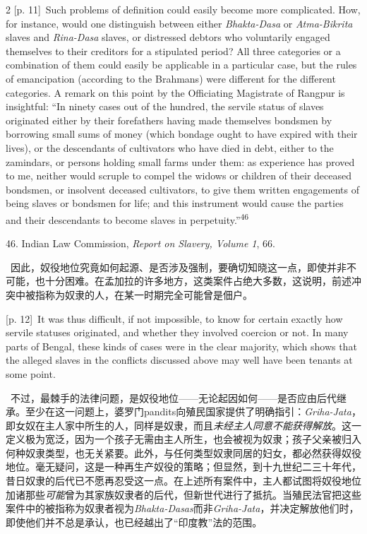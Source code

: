 \documentclass[10pt,a4paper]{article}
\begin{document}
\begin{paracol}{2}
\switchcolumn
{\scriptsize\color{gray} [p. 11]}\ Such problems of definition could easily become more complicated. How, for instance, would one distinguish between either \textit{Bhakta-Dasa} or \textit{Atma-Bikrita} slaves and \textit{Rina-Dasa} slaves, or distressed debtors who voluntarily engaged themselves to their creditors for a stipulated period? All three categories or a combination of them could easily be applicable in a particular case, but the rules of emancipation (according to the Brahmans) were different for the different categories. A remark on this point by the Officiating Magistrate of Rangpur is insightful: “In ninety cases out of the hundred, the servile status of slaves originated either by their forefathers having made themselves bondsmen by borrowing small sums of money (which bondage ought to have expired with their lives), or the descendants of cultivators who have died in debt, either to the zamindars, or persons holding small farms under them: as experience has proved to me, neither would scruple to compel the widows or children of their deceased bondsmen, or insolvent deceased cultivators, to give them written engagements of being slaves or bondsmen for life; and this instrument would cause the parties and their descendants to become slaves in perpetuity.”\nobreak\textsuperscript{46}\par{\small 46. Indian Law Commission, \textit{Report on Slavery, Volume 1}, 66.\par}
\switchcolumn*
{\scriptsize\color{gray} [p. 12]}\ 因此，奴役地位究竟如何起源、是否涉及强制，要确切知晓这一点，即使并非不可能，也十分困难。在孟加拉的许多地方，这类案件占绝大多数，这说明，前述冲突中被指称为奴隶的人，在某一时期完全可能曾是佃户。\par
\switchcolumn
{\scriptsize\color{gray} [p. 12]}\ It was thus difficult, if not impossible, to know for certain exactly how servile statuses originated, and whether they involved coercion or not. In many parts of Bengal, these kinds of cases were in the clear majority, which shows that the alleged slaves in the conflicts discussed above may well have been tenants at some point.\par
\switchcolumn*
{\scriptsize\color{gray} [p. 12]}\ 不过，最棘手的法律问题，是奴役地位——无论起因如何——是否应由后代继承。至少在这一问题上，婆罗门pandits向殖民国家提供了明确指引：\textit{Griha-Jata}，即女奴在主人家中所生的人，同样是奴隶，而且\textit{未经主人同意不能获得解放}。这一定义极为宽泛，因为一个孩子无需由主人所生，也会被视为奴隶；孩子父亲被归入何种奴隶类型，也无关紧要。此外，与任何类型奴隶同居的妇女，都必然获得奴役地位。毫无疑问，这是一种再生产奴役的策略；但显然，到十九世纪二三十年代，昔日奴隶的后代已不愿再忍受这一点。在上述所有案件中，主人都试图将奴役地位加诸那些\textit{可能}曾为其家族奴隶者的后代，但新世代进行了抵抗。当殖民法官把这些案件中的被指称为奴隶者视为\textit{Bhakta-Dasas}而非\textit{Griha-Jata}，并决定解放他们时，即使他们并不总是承认，也已经越出了“印度教”法的范围。\par

\end{paracol}
\end{document}
